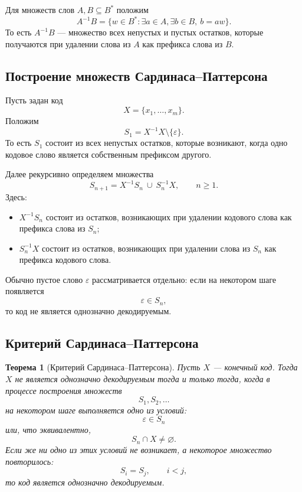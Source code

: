 \documentclass[12pt,a4paper]{article}
\newtheorem{theorem}{Теорема}[section]
\begin{document}
Для множеств слов $A,B\subseteq B^*$ положим
\[
    A^{-1}B
    =
    \{w\in B^*: \exists a\in A,\exists b\in B,\ b=aw\}.
\]
То есть $A^{-1}B$ --- множество всех непустых и пустых остатков, которые получаются при удалении слова из $A$ как префикса слова из $B$.

\subsection{Построение множеств Сардинаса--Паттерсона}

Пусть задан код
\[
    X=\{x_1,\dots,x_m\}.
\]
Положим
\[
    S_1=X^{-1}X\setminus\{\varepsilon\}.
\]
То есть $S_1$ состоит из всех непустых остатков, которые возникают, когда одно кодовое слово является собственным префиксом другого.

Далее рекурсивно определяем множества
\[
    S_{n+1}
    =
    X^{-1}S_n\ \cup\ S_n^{-1}X,
    \qquad n\ge 1.
\]
Здесь:
\begin{itemize}
    \item $X^{-1}S_n$ состоит из остатков, возникающих при удалении кодового слова как префикса слова из $S_n$;
    \item $S_n^{-1}X$ состоит из остатков, возникающих при удалении слова из $S_n$ как префикса кодового слова.
\end{itemize}

Обычно пустое слово $\varepsilon$ рассматривается отдельно:
если на некотором шаге появляется
\[
    \varepsilon\in S_n,
\]
то код не является однозначно декодируемым.

\subsection{Критерий Сардинаса--Паттерсона}

\begin{theorem}[Критерий Сардинаса--Паттерсона]
Пусть $X$ --- конечный код. Тогда $X$ не является однозначно декодируемым тогда и только тогда, когда в процессе построения множеств
\[
    S_1,S_2,\dots
\]
на некотором шаге выполняется одно из условий:
\[
    \varepsilon\in S_n
\]
или, что эквивалентно,
\[
    S_n\cap X\ne \varnothing.
\]
Если же ни одно из этих условий не возникает, а некоторое множество повторилось:
\[
    S_i=S_j,\qquad i<j,
\]
то код является однозначно декодируемым.
\end{theorem}
\end{document}
